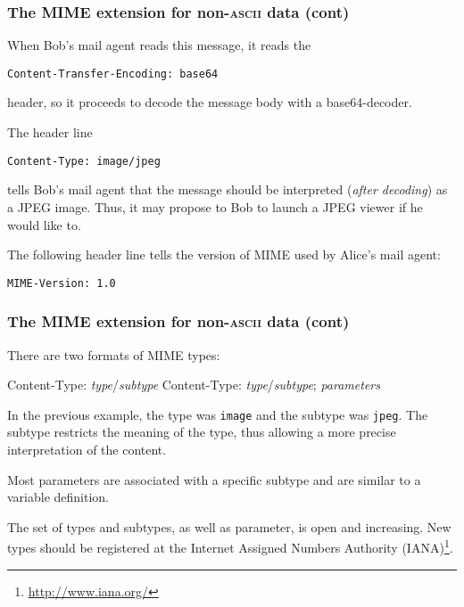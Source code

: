 %
\begin{frame}[containsverbatim]
\frametitle{The MIME extension for non-\textsc{ascii} data (cont)}

When Bob's mail agent reads this message, it reads the 
{\small 
\begin{verbatim}
Content-Transfer-Encoding: base64
\end{verbatim}
} 
header, so it proceeds to decode the message body with a
base64-decoder.

The header line 
{\small 
\begin{verbatim}
Content-Type: image/jpeg
\end{verbatim}
} 
tells Bob's mail agent that the message should be interpreted
(\emph{after decoding}) as a JPEG image. Thus, it may propose to Bob
to launch a JPEG viewer if he would like to.

The following header line tells the version of MIME used by Alice's
mail agent: {\small
\begin{verbatim}
MIME-Version: 1.0
\end{verbatim}
} 

\end{frame}

%
\begin{frame}[containsverbatim]
\frametitle{The MIME extension for non-\textsc{ascii} data (cont)}

There are two formats of MIME types:
{\small
\begin{semiverbatim}
Content-Type: \emph{type}/\emph{subtype}
Content-Type: \emph{type}/\emph{subtype}; \emph{parameters}
\end{semiverbatim}
}
In the previous example, the type was \verb+image+ and the subtype was
\verb+jpeg+. The subtype restricts the meaning of the type, thus
allowing a more precise interpretation of the content. 

Most parameters are associated with a specific subtype and are similar
to a variable definition.

The set of types and subtypes, as well as parameter, is open and
increasing. New types should be registered at the Internet Assigned
Numbers Authority (IANA)\footnote{\url{http://www.iana.org/}}.

\end{frame}

